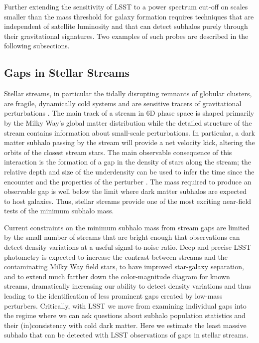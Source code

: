 Further extending the sensitivity of LSST to a power spectrum cut-off on scales smaller than the mass threshold for galaxy formation requires techniques that are independent of satellite luminosity and that can detect subhalos purely through their gravitational signatures. Two examples of such probes are described in the following subsections.


\subsection{Gaps in Stellar Streams }
\label{sec:stream_gaps}

Stellar streams, in particular the tidally disrupting remnants of globular clusters, are fragile, dynamically cold systems and are sensitive tracers of gravitational perturbations \citep[][]{2002MNRAS.332..915I,2002ApJ...570..656J,2011ApJ...731...58Y,Carlberg:2012}.
The main track of a stream in 6D phase space is shaped primarily by the Milky Way's global matter distribution while the detailed structure of the stream contains information about small-scale perturbations. 
In particular, a dark matter subhalo passing by the stream will provide a net velocity kick, altering the orbits of the closest stream stars.
The main observable consequence of this interaction is the formation of a gap in the density of stars along the stream; the relative depth and size of the underdensity can be used to infer the time since the encounter and the properties of the perturber \citep{Carlberg:2012, Erkal:2015}. The mass required to produce an observable gap \citep[$10^5-10^6 \Msun$,][]{erkal2016,bovy:2017} is well below the limit where dark matter subhalos are expected to host galaxies. Thus, stellar streams provide one of the most exciting near-field tests of the minimum subhalo mass.

Current constraints on the minimum subhalo mass from stream gaps are limited by the small number of streams that are bright enough that observations can detect density variations at a useful signal-to-noise ratio. Deep and precise LSST photometry is expected to increase the contrast between streams and the contaminating Milky Way field stars, to have improved star-galaxy separation, and to extend much farther down the color-magnitude diagram for known streams, dramatically increasing our ability to detect density variations and thus leading to the identification of less prominent gaps created by low-mass perturbers. Critically, with LSST we move from examining individual gaps into the regime where we can ask questions about subhalo population statistics and their (in)consistency with cold dark matter.
Here we estimate the least massive subhalo that can be detected with LSST observations of gaps in stellar streams.

